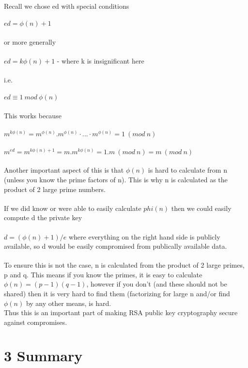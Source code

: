 \documentclass[11pt]{article}   	%
\begin{document}
Recall we chose ed with special conditions \\
\\
$ ed = \phi(n) + 1 $ \\
\\
or more generally \\
\\
$ ed = k\phi(n) + 1 $ - where k is insignificant here \\
\\
i.e. \\
\\
$ ed \equiv 1 \  mod \ \phi(n) $ \\
\\
This works because \\
\\
$ m^{k \phi(n)} = m^{\phi(n)} . m^{\phi(n)} · . . . · m^{\phi(n)} = 1 \ (mod \ n) $ \\
\\
$ m^{ed} = m^{k\phi(n) + 1} = m . m^{k \phi(n)} = 1.m \ (mod \ n) = m \ (mod \ n) $ \\
\\
Another important aspect of this is that $ \phi(n) $ is hard to calculate from n (unless you know the prime factors of n). This is why n is calculated as the product of 2 large prime numbers. \\
\\
If we did know or were able to easily calculate $ phi(n) $ then we could easily compute d the private key \\
\\
$ d = (\phi(n) + 1) / e $ where everything on the right hand side is publicly available, so d would be easily compromised from publically available data. \\
\\
To ensure this is not the case, n is calculated from the product of 2 large primes, p and q. This means if you know the primes, it is easy to calculate $ \phi(n) = (p-1)(q-1) $, however if you don't (and these should not be shared) then it is very hard to find them (factorizing for large n and/or find $ \phi(n) $ by any other means, is hard. \\
Thus this is an important part of making RSA public key cryptography secure against compromises. 

\break


\section*{3 Summary}
\end{document}
